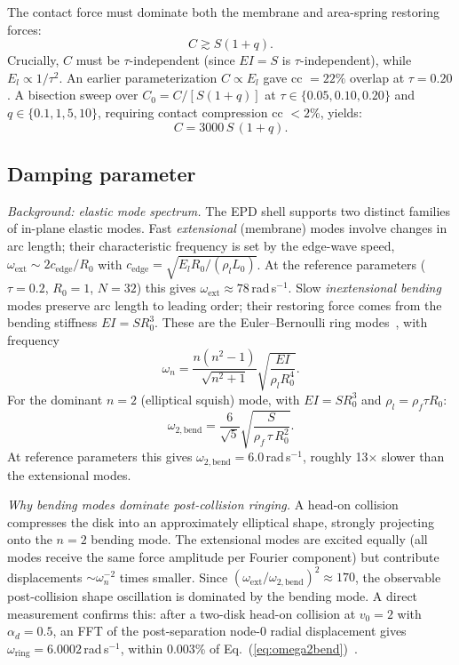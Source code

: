 \documentclass[aps,pre,twocolumn,floatfix,longbibliography]{revtex4-2}
\newcommand{\El}{E_l}
\begin{document}
The contact force must dominate both the membrane and area-spring restoring forces:
\begin{equation}
  C \gtrsim S(1 + q).
\label{eq:Ccrit}
\end{equation}
Crucially, $C$ must be $\tau$-independent (since $EI = S$ is $\tau$-independent),
while $\El \propto 1/\tau^2$.  An earlier parameterization $C \propto \El$ gave
cc $= 22\%$ overlap at $\tau = 0.20$.  A bisection sweep over $C_0 = C/[S(1+q)]$
at $\tau \in \{0.05, 0.10, 0.20\}$ and $q \in \{0.1, 1, 5, 10\}$, requiring
contact compression cc $< 2\%$, yields:
\begin{equation}
  \boxed{C = 3000\,S\,(1 + q).}
\label{eq:C}
\end{equation}

\subsection{Damping parameter}
\label{sec:damp_calib}

\textit{Background: elastic mode spectrum.}
The EPD shell supports two distinct families of in-plane elastic modes.
Fast \emph{extensional} (membrane) modes involve changes in arc length;
their characteristic frequency is set by the edge-wave speed,
$\omega_\text{ext} \sim 2c_\text{edge}/R_0$ with
$c_\text{edge} = \sqrt{E_l R_0/(\rho_l L_0)}$.
At the reference parameters ($\tau = 0.2$, $R_0 = 1$, $N = 32$)
this gives $\omega_\text{ext} \approx 78$\,rad\,s$^{-1}$.
Slow \emph{inextensional bending} modes preserve arc length to leading
order; their restoring force comes from the bending stiffness $EI = SR_0^3$.
These are the Euler--Bernoulli ring modes~\cite{Soedel2004}, with
frequency~\cite{Wah1962}
\begin{equation}
  \omega_n = \frac{n(n^2-1)}{\sqrt{n^2+1}}
    \sqrt{\frac{EI}{\rho_l R_0^4}}.
\label{eq:ring_bend}
\end{equation}
For the dominant $n = 2$ (elliptical squish) mode, with
$EI = SR_0^3$ and $\rho_l = \rho_f \tau R_0$:
\begin{equation}
  \omega_{2,\text{bend}} = \frac{6}{\sqrt{5}}
    \sqrt{\frac{S}{\rho_f\,\tau\,R_0^2}}.
\label{eq:omega2bend}
\end{equation}
At reference parameters this gives $\omega_{2,\text{bend}} = 6.0$\,rad\,s$^{-1}$,
roughly 13$\times$ slower than the extensional modes.

\textit{Why bending modes dominate post-collision ringing.}
A head-on collision compresses the disk into an approximately elliptical shape,
strongly projecting onto the $n = 2$ bending mode.  The extensional modes are
excited equally (all modes receive the same force amplitude per Fourier component)
but contribute displacements $\sim \omega_n^{-2}$ times smaller.  Since
$(\omega_\text{ext}/\omega_{2,\text{bend}})^2 \approx 170$, the observable
post-collision shape oscillation is dominated by the bending mode.  A direct
measurement confirms this: after a two-disk head-on collision at $v_0 = 2$
with $\alpha_d = 0.5$, an FFT of the post-separation node-0 radial displacement
gives $\omega_\text{ring} = 6.0002$\,rad\,s$^{-1}$, within 0.003\% of
Eq.~(\ref{eq:omega2bend})~\cite{dampcalib_code}.
\end{document}
